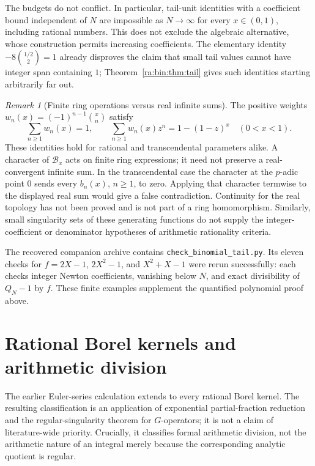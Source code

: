 \documentclass[11pt,a4paper]{article}
\theoremstyle{definition}
\theoremstyle{remark}
\newtheorem{remark}[theorem]{Remark}
\theoremstyle{plain}
\numberwithin{equation}{section}
\begin{document}
The budgets do not conflict.  In particular, tail-unit identities with a coefficient bound independent of $N$
are impossible as $N\to\infty$ for every $x\in(0,1)$,
including rational numbers.  This does not exclude the algebraic
alternative, whose construction permits increasing coefficients.
The elementary identity $-8\binom{1/2}{2}=1$ already disproves
the claim that small tail values cannot have integer span
containing $1$; Theorem~\ref{ra:bin:thm:tail} gives such identities
starting arbitrarily far out.

\begin{remark}[Finite ring operations versus real infinite sums]
The positive weights $w_n(x)=(-1)^{n-1}\binom xn$ satisfy
\[
 \sum_{n\ge1}w_n(x)=1,\qquad
 \sum_{n\ge1}w_n(x)z^n=1-(1-z)^x
 \quad(0<x<1).
\]
These identities hold for rational and transcendental parameters
alike.  A character of $\mathcal B_x$ acts on finite ring
expressions; it need not preserve a real-convergent infinite sum.
In the transcendental case the character at the $p$-adic point
$0$ sends every $b_n(x)$, $n\ge1$, to zero.  Applying that
character termwise to the displayed real sum would give a false
contradiction.  Continuity for the real topology has not been
proved and is not part of a ring homomorphism.  Similarly, small
singularity sets of these generating functions do not supply the
integer-coefficient or denominator hypotheses of arithmetic
rationality criteria.
\end{remark}

The recovered companion archive contains
\texttt{check\_binomial\_tail.py}. Its eleven checks for
$f=2X-1$, $2X^2-1$, and $X^2+X-1$ were rerun successfully: each checks
integer Newton coefficients, vanishing below $N$, and exact divisibility
of $Q_N-1$ by $f$. These finite examples supplement the quantified
polynomial proof above.


\section{Rational Borel kernels and arithmetic division}
\label{ra:sec:borel}

The earlier Euler-series calculation extends to every rational Borel
kernel.  The resulting classification is an application of exponential
partial-fraction reduction and the regular-singularity theorem for
$G$-operators; it is not a claim of literature-wide priority.  Crucially,
it classifies formal arithmetic division, not the arithmetic nature of an
integral merely because the corresponding analytic quotient is regular.
\end{document}
